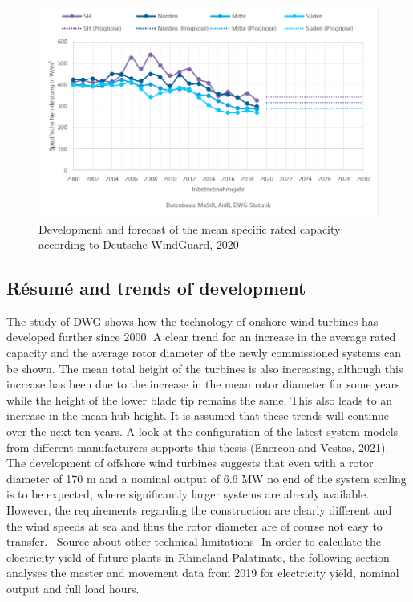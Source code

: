 \documentclass[a4paper,11pt]{article}
\begin{document}
\begin{figure}[H]

{\centering \includegraphics[width=1\linewidth]{figures/DWG/DWG_Spezifische_Nennleistung} 

}

\caption{Development and forecast of the mean specific rated capacity according to Deutsche WindGuard, 2020}\label{fig:spec}
\end{figure}
\hypertarget{ruxe9sumuxe9-and-trends-of-development}{%
\subsection{Résumé and trends of development}\label{ruxe9sumuxe9-and-trends-of-development}}

The study of DWG shows how the technology of onshore wind turbines has developed further since 2000. A clear trend for an increase in the average rated capacity and the average rotor diameter of the newly commissioned systems can be shown. The mean total height of the turbines is also increasing, although this increase has been due to the increase in the mean rotor diameter for some years while the height of the lower blade tip remains the same. This also leads to an increase in the mean hub height. It is assumed that these trends will continue over the next ten years. A look at the configuration of the latest system models from different manufacturers supports this thesis (Enercon and Vestas, 2021). The development of offshore wind turbines suggests that even with a rotor diameter of 170 m and a nominal output of 6.6 MW no end of the system scaling is to be expected, where significantly larger systems are already available. However, the requirements regarding the construction are clearly different and the wind speeds at sea and thus the rotor diameter are of course not easy to transfer. --Source about other technical limitations-
In order to calculate the electricity yield of future plants in Rhineland-Palatinate, the following section analyses the master and movement data from 2019 for electricity yield, nominal output and full load hours.
\end{document}
